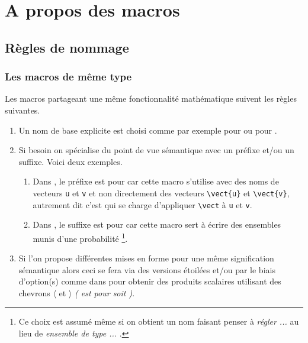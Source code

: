 \documentclass[12pt,a4paper]{book}
\begin{document}
\section{A propos des macros}

\subsection{Règles de nommage}

\subsubsection{Les macros de même \og type \fg}

Les macros partageant une même fonctionnalité mathématique suivent les règles suivantes.

\begin{enumerate}[itemsep = .5em]
	\item Un nom de base explicite est choisi comme par exemple  pour  ou  pour .

	\item Si besoin on spécialise du point de vue sémantique avec un préfixe et/ou un suffixe. Voici deux exemples.
	\begin{enumerate}
		\item Dans , le préfixe  est pour  car cette macro s'utilise avec des noms de vecteurs \verb+u+ et \verb+v+ et non directement des vecteurs \verb+\vect{u}+ et \verb+\vect{v}+, autrement dit c'est  qui se charge d'appliquer \verb+\vect+ à \verb+u+ et \verb+v+.

		\item Dans , le suffixe  est pour  car cette macro sert à écrire des ensembles munis d'une probabilité
	      \footnote{
	      	Ce choix est assumé même si on obtient un nom faisant penser à \emph{\og régler ... \fg} au lieu de \emph{\og ensemble de type ... \fg}.
		  }.
	\end{enumerate}

	\item Si l'on propose différentes mises en forme pour une même signification sémantique alors ceci se fera via des versions étoilées et/ou par le biais d'option(s) comme dans  pour obtenir des produits scalaires utilisant des chevrons $\langle$ et $\rangle$ \emph{( est pour  soit )}.
\end{enumerate}
\end{document}
